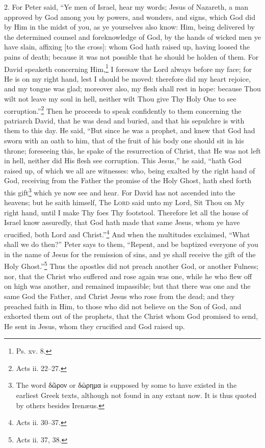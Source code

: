 2. For Peter said, “Ye men of Israel, hear my words; Jesus of Nazareth, a man approved by God among you by powers, and wonders, and signs, which God did by Him in the midst of you, as ye yourselves also know: Him, being delivered by the determined counsel and foreknowledge of God, by the hands of wicked men ye have slain, affixing [to the cross]: whom God hath raised up, having loosed the pains of death; because it was not possible that he should be holden of them. For David speaketh concerning Him,\footnote{Ps. xv. 8.} I foresaw the Lord always before my face; for He is on my right hand, lest I should be moved: therefore did my heart rejoice, and my tongue was glad; moreover also, my flesh shall rest in hope: because Thou wilt not leave my soul in hell, neither wilt Thou give Thy Holy One to see corruption.”\footnote{Acts ii. 22–27.} Then he proceeds to speak confidently to them concerning the patriarch David, that he was dead and buried, and that his sepulchre is with them to this day. He said, “But since he was a prophet, and knew that God had sworn with an oath to him, that of the fruit of his body one should sit in his throne; foreseeing this, he spake of the resurrection of Christ, that He was not left in hell, neither did His flesh see corruption. This Jesus,” he said, “hath God raised up, of which we all are witnesses: who, being exalted by the right hand of God, receiving from the Father the promise of the Holy Ghost, hath shed forth this gift\footnote{The word \textgreek{δῶρον} or \textgreek{δώρημα} is supposed by some to have existed in the earliest Greek texts, although not found in any extant now. It is thus quoted by others besides Irenæus.} which ye now see and hear. For David has not ascended into the heavens; but he saith himself, The \textsc{Lord} said unto my Lord, Sit Thou on My right hand, until I make Thy foes Thy footstool. Therefore let all the house of Israel know assuredly, that God hath made that same Jesus, whom ye have crucified, both Lord and Christ.”\footnote{Acts ii. 30–37.} And when the multitudes exclaimed, “What shall we do then?” Peter says to them, “Repent, and be baptized everyone of you in the name of Jesus for the remission of sins, and ye shall receive the gift of the Holy Ghost.”\footnote{Acts ii. 37, 38.} Thus the apostles did not preach another God, or another Fulness; nor, that the Christ who suffered and rose again was one, while he who flew off on high was another, and remained impassible; but that there was one and the same God the Father, and Christ Jesus who rose from the dead; and they preached faith in Him, to those who did not believe on the Son of God, and exhorted them out of the prophets, that the Christ whom God promised to send, He sent in Jesus, whom they crucified and God raised up.

